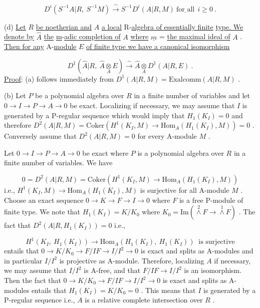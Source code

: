 \begin{equation*}
D^i(S^{-1}A|R, \ S^{-1}M) \xrightarrow{\ \sim\ } S^{-1}D^i(A|R, M)  \ \underline{\text{for all}} \ \ i \geq 0  \ .
\end{equation*}


(d)  \underline{Let}  $R$  \underline{be noetherian and}  $A$  \underline{a local} R-\underline{algebra of essentially finite} \underline{type. We denote by}  $\hat{A}$  \underline{the} \underline{m}-\underline{adic completion of}  $A$  \underline{where}  $\underline{m}$ = \underline{the maximal ideal of} $A$  .  \underline{Then for any} A-\underline{module}  $E$  \underline{of finite type we have a canonical isomorphism}

\begin{equation*}
D^1(\hat{A}|R, \ \hat{A} \underset{A}{\otimes} E) \xrightarrow{\ \sim\ } \hat{A} \underset{A}{\otimes} D^1(A|R, E)  \ .
\end{equation*}
\underline{Proof}:  (a)  follows immediately from  $D^1(A|R, M) = \mathrm{Exalcomm}(A|R, M)$ .

(b)  Let  $P$  be a polynomial algebra over  $R$  in a finite number of variables and let  $0 \to I \to P \to A \to 0$  be exact. Localizing if necessary, we may assume that  $I$  is generated by a P-regular sequence which would imply that  $H_1(K_I) = 0$ and therefore  $D^2(A|R, M) = \mathrm{Coker}(H^1(K_I, M) \to \mathrm{Hom}_A(H_1(K_I), M)) = 0$  . Conversely assume that  $D^2(A|R, M) = 0$  for every A-module  $M$  .

Let  $0 \to I \to P \to A \to 0$  be exact where  $P$  is a polynomial algebra over $R$  in a finite number of variables. We have

\begin{equation*}
0 = D^2(A|R, M) = \mathrm{Coker}(H^1(K_I, M) \to \mathrm{Hom}_A(H_1(K_I), M))
\end{equation*}
i.e.,  $H^1(K_I, M) \to \mathrm{Hom}_A(H_1(K_I), M)$  is surjective for all A-module  $M$  . Choose an exact sequence  $0 \to K \to F \to I \to 0$  where  $F$  is a free P-module of finite type. We note that  $H_1(K_I) = K/K_0$  where  $K_0 = \mathrm{Im}(\overset{2}{\wedge} F \to \overset{1}{\wedge} F)$  . The fact that $D^2(A|R, H_1(K_I)) = 0$  i.e.,

\begin{equation*}
H^1(K_I, \ H_1(K_I)) \to \mathrm{Hom}_A(H_1(K_I), \ H_1(K_I))  \ \text{ is surjective}
\end{equation*}
entails that  $0 \to K/K_0 \to F/IF \to I/I^2 \to 0$  is exact and splits as A-modules and in particular  $I/I^2$  is projective as A-module. Therefore, localizing  $A$  if necessary, we may assume that  $I/I^2$  is  A-free, and that  $F/IF \to I/I^2$  is an isomorphism. Then the fact that  $0 \to K/K_0 \to F/IF \to I/I^2 \to 0$  is exact and splits as A-modules entails that  $H_1(K_I) = K/K_0 = 0$  . This means that  $I$  is generated by a P-regular sequence i.e.,  $A$  is a relative complete intersection over  $R$  .

